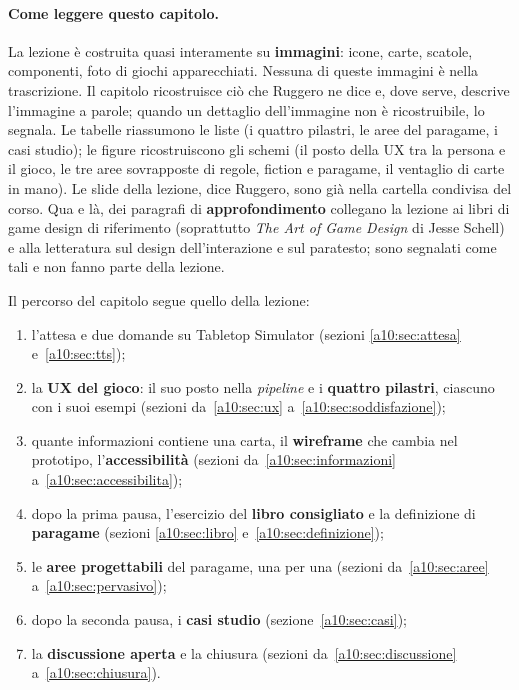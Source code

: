 \paragraph{Come leggere questo capitolo.} La lezione è costruita quasi interamente
su \textbf{immagini}: icone, carte, scatole, componenti, foto di giochi apparecchiati.
Nessuna di queste immagini è nella trascrizione. Il capitolo ricostruisce ciò che
Ruggero ne dice e, dove serve, descrive l'immagine a parole; quando un dettaglio
dell'immagine non è ricostruibile, lo segnala. Le tabelle riassumono le liste (i
quattro pilastri, le aree del paragame, i casi studio); le figure ricostruiscono gli
schemi (il posto della UX tra la persona e il gioco, le tre aree sovrapposte di
regole, fiction e paragame, il ventaglio di carte in mano). Le slide della lezione,
dice Ruggero, sono già nella cartella condivisa del corso. Qua e là, dei paragrafi di
\textbf{approfondimento} collegano la lezione ai libri di game design di riferimento
(soprattutto \emph{The Art of Game Design} di Jesse Schell) e alla letteratura sul
design dell'interazione e sul paratesto; sono segnalati come tali e non fanno parte
della lezione.

Il percorso del capitolo segue quello della lezione:
\begin{enumerate}
  \item l'attesa e due domande su Tabletop Simulator (sezioni \ref{a10:sec:attesa}
        e~\ref{a10:sec:tts});
  \item la \textbf{UX del gioco}: il suo posto nella \emph{pipeline} e i
        \textbf{quattro pilastri}, ciascuno con i suoi esempi (sezioni
        da~\ref{a10:sec:ux} a~\ref{a10:sec:soddisfazione});
  \item quante informazioni contiene una carta, il \textbf{wireframe} che cambia
        nel prototipo, l'\textbf{accessibilità} (sezioni da~\ref{a10:sec:informazioni}
        a~\ref{a10:sec:accessibilita});
  \item dopo la prima pausa, l'esercizio del \textbf{libro consigliato} e la
        definizione di \textbf{paragame} (sezioni \ref{a10:sec:libro}
        e~\ref{a10:sec:definizione});
  \item le \textbf{aree progettabili} del paragame, una per una (sezioni
        da~\ref{a10:sec:aree} a~\ref{a10:sec:pervasivo});
  \item dopo la seconda pausa, i \textbf{casi studio} (sezione~\ref{a10:sec:casi});
  \item la \textbf{discussione aperta} e la chiusura (sezioni
        da~\ref{a10:sec:discussione} a~\ref{a10:sec:chiusura}).
\end{enumerate}

